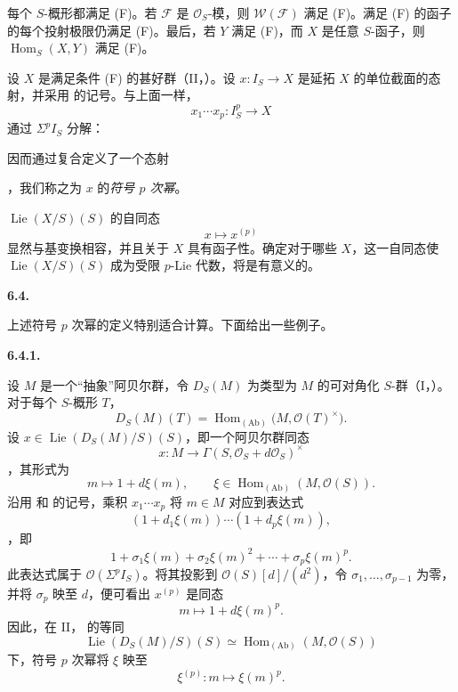 每个 \(S\)-概形都满足 (F)。若 \(\mathcal F\) 是 \(\mathcal O_S\)-模，则 \(\mathcal W(\mathcal F)\) 满足 (F)。满足 (F) 的函子的每个投射极限仍满足 (F)。最后，若 \(Y\) 满足 (F)，而 \(X\) 是任意 \(S\)-函子，则 \(\operatorname{Hom}_S(X,Y)\) 满足 (F)。

设 \(X\) 是满足条件 (F) 的甚好群（II，）。设 \(x:I_S\to X\) 是延拓 \(X\) 的单位截面的态射，并采用  的记号。与上面一样，
\[
  x_1\cdots x_p:I_S^p\longrightarrow X
\]
通过 \(\Sigma^p I_S\) 分解：
\begin{center}
  \label{sga3:VIIA:6.3-symbolic-power-factorization}
  
\end{center}
因而通过复合定义了一个态射
\begin{center}
  \label{sga3:VIIA:6.3-symbolic-pth-power-composite}
  
\end{center}
，我们称之为 \(x\) 的\emph{符号 \(p\) 次幂}。

\(\operatorname{Lie}(X/S)(S)\) 的自同态
\[
  x\longmapsto x^{(p)}
\]
显然与基变换相容，并且关于 \(X\) 具有函子性。确定对于哪些 \(X\)，这一自同态使 \(\operatorname{Lie}(X/S)(S)\) 成为受限 \(p\)-Lie 代数，将是有意义的。

\medskip
\noindent\textbf{6.4.}
\label{sga3:VIIA:6.4}

上述符号 \(p\) 次幂的定义特别适合计算。下面给出一些例子。

\medskip
\noindent\textbf{6.4.1.}
\label{sga3:VIIA:6.4.1}

设 \(M\) 是一个“抽象”阿贝尔群，令 \(D_S(M)\) 为类型为 \(M\) 的可对角化 \(S\)-群（I，）。对于每个 \(S\)-概形 \(T\)，
\[
  D_S(M)(T)
  =
  \operatorname{Hom}_{(\mathrm{Ab})}
  \bigl(M,\mathcal O(T)^\times\bigr).
\]
设 \(x\in\operatorname{Lie}(D_S(M)/S)(S)\)，即一个阿贝尔群同态
\[
  x:M\longrightarrow
  \Gamma(S,\mathcal O_S+d\mathcal O_S)^\times
\]
，其形式为
\[
  m\longmapsto1+d\xi(m),
  \qquad
  \xi\in
  \operatorname{Hom}_{(\mathrm{Ab})}(M,\mathcal O(S)).
\]
沿用  和  的记号，乘积 \(x_1\cdots x_p\) 将 \(m\in M\) 对应到表达式
\[
  (1+d_1\xi(m))\cdots(1+d_p\xi(m)),
\]
，即
\[
  1+\sigma_1\xi(m)+\sigma_2\xi(m)^2+\cdots+
  \sigma_p\xi(m)^p.
\]
此表达式属于 \(\mathcal O(\Sigma^p I_S)\)。将其投影到 \(\mathcal O(S)[d]/(d^2)\)，令 \(\sigma_1,\ldots,\sigma_{p-1}\) 为零，并将 \(\sigma_p\) 映至 \(d\)，便可看出 \(x^{(p)}\) 是同态
\[
  m\longmapsto1+d\xi(m)^p.
\]
因此，在 II， 的等同
\[
  \operatorname{Lie}(D_S(M)/S)(S)
  \simeq
  \operatorname{Hom}_{(\mathrm{Ab})}(M,\mathcal O(S))
\]
下，符号 \(p\) 次幂将 \(\xi\) 映至
\[
  \xi^{(p)}:m\longmapsto\xi(m)^p.
\]


